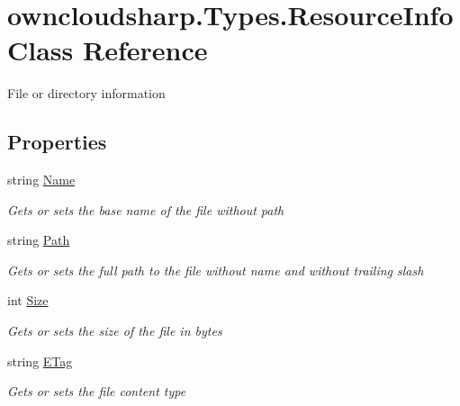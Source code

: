 \hypertarget{classowncloudsharp_1_1_types_1_1_resource_info}{}\section{owncloudsharp.\+Types.\+Resource\+Info Class Reference}
\label{classowncloudsharp_1_1_types_1_1_resource_info}


File or directory information  


\subsection*{Properties}
\begin{DoxyCompactItemize}
\item 
string \hyperlink{classowncloudsharp_1_1_types_1_1_resource_info_a185e315b908518a2ab426ae3ed0c8281}{Name}
\begin{DoxyCompactList}\small\item\em Gets or sets the base name of the file without path \end{DoxyCompactList}\item 
string \hyperlink{classowncloudsharp_1_1_types_1_1_resource_info_a6ac3b97ca9a39dedb9de16ad5e80494f}{Path}
\begin{DoxyCompactList}\small\item\em Gets or sets the full path to the file without name and without trailing slash \end{DoxyCompactList}\item 
int \hyperlink{classowncloudsharp_1_1_types_1_1_resource_info_a57a5a4cfa8448999170ff68297d262f1}{Size}
\begin{DoxyCompactList}\small\item\em Gets or sets the size of the file in bytes \end{DoxyCompactList}\item 
string \hyperlink{classowncloudsharp_1_1_types_1_1_resource_info_ae4e1ffb22dbd826289cada284e9b4a78}{E\+Tag}
\begin{DoxyCompactList}\small\item\em Gets or sets the file content type \end{DoxyCompactList}\item 

\end{DoxyCompactItemize}
